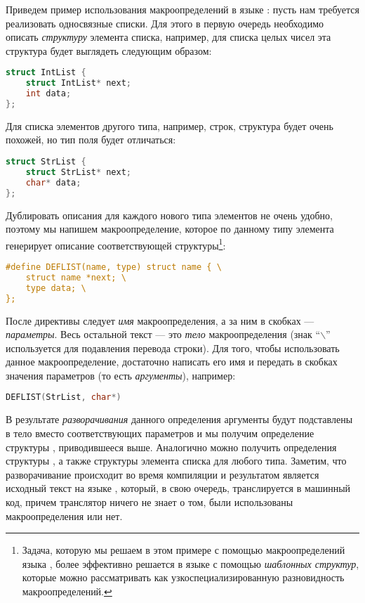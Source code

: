 Приведем пример использования макроопределений в языке : пусть нам требуется реализовать односвязные списки. Для этого в первую очередь необходимо описать \emph{структуру} элемента списка, например, для списка целых чисел эта структура будет выглядеть следующим образом:
\begin{lstlisting}[language=C]
struct IntList {
	struct IntList* next;
	int data;
};
\end{lstlisting}
Для списка элементов другого типа, например, строк, структура будет очень похожей, но тип поля  будет отличаться:
\begin{lstlisting}[language=C]
struct StrList {
	struct StrList* next;
	char* data;
};
\end{lstlisting}
Дублировать описания для каждого нового типа элементов не очень удобно, поэтому мы напишем макроопределение, которое по данному типу элемента генерирует описание соответствующей структуры\footnote{Задача, которую мы решаем в этом примере с помощью макроопределений языка , более эффективно решается в языке  с помощью \emph{шаблонных структур}, которые можно рассматривать как узкоспециализированную разновидность макроопределений.}:
\begin{lstlisting}[language=C]
#define DEFLIST(name, type) struct name { \
	struct name *next; \
	type data; \
};
\end{lstlisting}
После директивы  следует \emph{имя} макроопределения, а за ним в скобках --- \emph{параметры}. Весь остальной текст --- это \emph{тело} макроопределения (знак ``$\backslash$'' используется для подавления перевода строки). Для того, чтобы использовать данное макроопределение, достаточно написать его имя и передать в скобках значения параметров (то есть \emph{аргументы}), например:

\begin{lstlisting}[language=C]
DEFLIST(StrList, char*)
\end{lstlisting}
В результате \emph{разворачивания} данного определения аргументы будут подставлены в тело вместо соответствующих параметров и мы получим определение структуры , приводившееся выше. Аналогично можно получить определения структуры , а также структуры элемента списка для любого типа. Заметим, что разворачивание происходит во время компиляции и результатом является исходный текст на языке , который, в свою очередь, транслируется в машинный код, причем транслятор ничего не знает о том, были использованы макроопределения или нет. 

